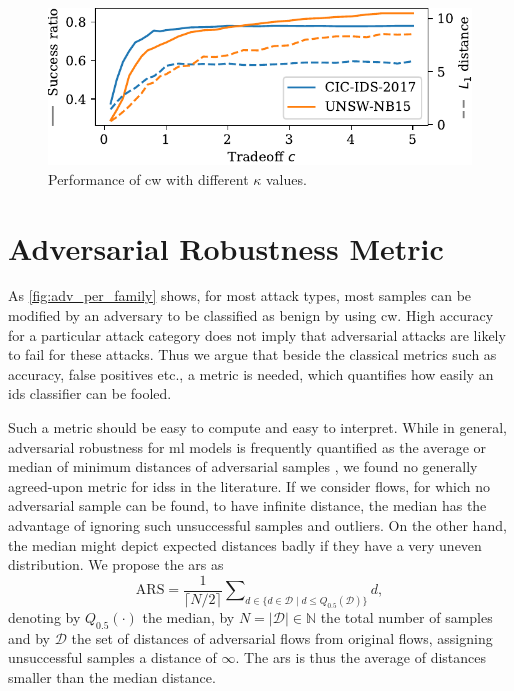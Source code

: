 \documentclass[conference]{IEEEtran}
\begin{document}
\begin{figure}[b]
\includegraphics[width=\columnwidth]{../plots/adv_comparison/tradeoff.pdf}
\caption{Performance of \gls{cw} with different $\kappa$ values.}
\label{fig:adv_cw}
\end{figure}

\section{Adversarial Robustness Metric}

As \autoref{fig:adv_per_family} shows, for most attack types, most samples can be modified by an adversary to be classified as benign by using \gls{cw}. High accuracy for a particular attack category does not imply that adversarial attacks are  likely to fail for these attacks. Thus we argue that beside the classical metrics such as accuracy, false positives etc., a metric is needed, which quantifies how easily an \gls{ids} classifier can be fooled.

Such a metric should be easy to compute and easy to interpret.
While in general, adversarial robustness for \gls{ml} models is frequently quantified as the average or median of minimum distances of adversarial samples \cite{carlini_evaluating_2019}, we found no generally agreed-upon metric for \glspl{ids} in the literature. If we consider flows, for which no adversarial sample can be found, to have infinite distance, the median has the advantage of ignoring such unsuccessful samples and outliers. On the other hand, the median might depict expected distances badly if they have a very uneven distribution. 
We propose the \gls{ars} as 
\begin{equation}
\text{ARS} = \frac{1}{\lceil N/2 \rceil} \sum\nolimits_{d \in \{d \in \mathcal D \mid d \leq Q_{0.5}(\mathcal D)\}} d,
\end{equation}
denoting by $Q_{0.5}(\cdot)$ the median, by $N = | \mathcal D | \in \mathbb N$ the total number of samples and by $\mathcal D$ the set of distances of adversarial flows from original flows, assigning unsuccessful samples a distance of $\infty$. 
The \gls{ars} is thus the average of distances smaller than the median distance.
\end{document}

